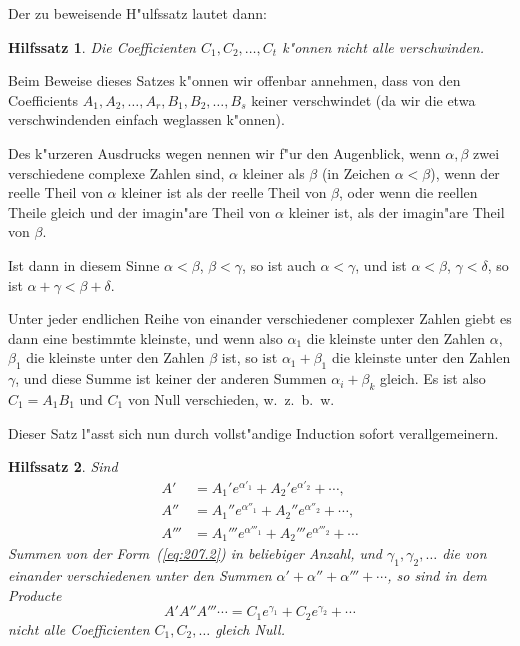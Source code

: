 \documentclass[10pt,a4paper]{article}
\theoremstyle{weberstyle}
\newtheorem{hilfssatz}{Hilfssatz}[section]
\begin{document}
Der zu beweisende H"ulfssatz lautet dann:

\begin{hilfssatz}
Die Coefficienten $C_1,C_2,\dots,C_t$ k"onnen nicht alle verschwinden.
\end{hilfssatz}

Beim Beweise dieses Satzes k"onnen wir offenbar annehmen, dass von den
Coefficients $A_1,A_2,\dots,A_r,B_1,B_2,\dots,B_s$ keiner verschwindet (da
wir die etwa verschwindenden einfach weglassen k"onnen).

Des k"urzeren Ausdrucks wegen nennen wir f"ur den Augenblick, wenn
$\alpha,\beta$ zwei verschiedene complexe Zahlen sind, $\alpha$ kleiner als
$\beta$ (in Zeichen $\alpha<\beta$), wenn der reelle Theil von $\alpha$
kleiner ist als der reelle Theil von $\beta$, oder wenn die reellen Theile
gleich und der imagin"are Theil von $\alpha$ kleiner ist, als der
imagin"are Theil von $\beta$.

Ist dann in diesem Sinne $\alpha<\beta$, $\beta<\gamma$, so ist auch
$\alpha<\gamma$, und ist $\alpha<\beta$, $\gamma<\delta$, so ist
$\alpha+\gamma<\beta+\delta$.

Unter jeder endlichen Reihe von einander verschiedener complexer Zahlen
giebt es dann eine bestimmte kleinste, und wenn also $\alpha_1$ die
kleinste unter den Zahlen $\alpha$, $\beta_1$ die kleinste unter den Zahlen
$\beta$ ist, so ist $\alpha_1+\beta_1$ die kleinste unter den Zahlen
$\gamma$, und diese Summe ist keiner der anderen Summen $\alpha_i+\beta_k$
gleich. Es ist also $C_1=A_1B_1$ und $C_1$ von Null verschieden,
w.~z.~b.~w.

Dieser Satz l"asst sich nun durch vollst"andige Induction sofort
verallgemeinern.

\begin{hilfssatz}
Sind
\begin{align*}
A' &= A_1'e^{\alpha'_1} + A_2'e^{\alpha'_2} + \cdots,\\
A'' &= A_1''e^{\alpha''_1} + A_2''e^{\alpha''_2} + \cdots,\\
A''' &= A_1'''e^{\alpha'''_1} + A_2'''e^{\alpha'''_2} + \cdots
\end{align*}
Summen von der Form~(\ref{eq:207.2}) in beliebiger Anzahl, und
$\gamma_1,\gamma_2,\dots$ die von einander verschiedenen unter den Summen
$\alpha'+\alpha''+\alpha'''+\cdots$, so sind in dem Producte
\begin{equation}\label{eq:207.5}
A'A''A'''\cdots = C_1e^{\gamma_1} + C_2e^{\gamma_2} + \cdots
\end{equation}
nicht alle Coefficienten $C_1,C_2,\dots$ gleich Null.
\end{hilfssatz}
\end{document}
